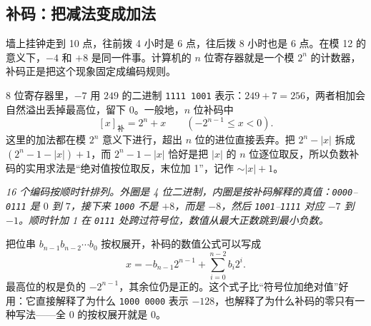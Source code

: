 \subsection{补码：把减法变成加法}

墙上挂钟走到 10 点，往前拨 4 小时是 6 点，往后拨 8 小时也是 6 点。在模 12 的意义下，$-4$ 和 $+8$ 是同一件事。计算机的 $n$ 位寄存器就是一个模 $2^n$ 的计数器，补码正是把这个现象固定成编码规则。

8 位寄存器里，$-7$ 用 $249$ 的二进制 \texttt{1111 1001} 表示：$249+7=256$，两者相加会自然溢出丢掉最高位，留下 0。一般地，$n$ 位补码中
\[
[x]_{\text{补}}=2^n+x\qquad(-2^{n-1}\le x<0).
\]
这里的加法都在模 $2^n$ 意义下进行，超出 $n$ 位的进位直接丢弃。把 $2^n-|x|$ 拆成 $(2^n-1-|x|)+1$，而 $2^n-1-|x|$ 恰好是把 $|x|$ 的 $n$ 位逐位取反，所以负数补码的实用求法是“绝对值按位取反，末位加 1”，记作 $\sim|x|+1$。

\begin{center}
\par\vspace{2pt}
{\footnotesize\itshape 16 个编码按顺时针排列。外圈是 4 位二进制，内圈是按补码解释的真值：\texttt{0000}--\texttt{0111} 是 $0$ 到 $7$，接下来 \texttt{1000} 不是 $+8$，而是 $-8$，然后 \texttt{1001}--\texttt{1111} 对应 $-7$ 到 $-1$。顺时针加 1 在 \texttt{0111} 处跨过符号位，数值从最大正数跳到最小负数。}
\end{center}

把位串 $b_{n-1}b_{n-2}\cdots b_0$ 按权展开，补码的数值公式可以写成
\[
x=-b_{n-1}2^{n-1}+\sum_{i=0}^{n-2}b_i2^i .
\]
最高位的权是负的 $-2^{n-1}$，其余位仍是正的。这个式子比“符号位加绝对值”好用：它直接解释了为什么 \texttt{1000 0000} 表示 $-128$，也解释了为什么补码的零只有一种写法——全 0 的按权展开就是 0。

